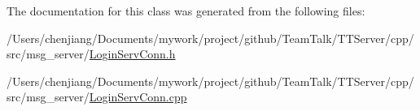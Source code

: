 The documentation for this class was generated from the following files\+:\begin{DoxyCompactItemize}
\item 
/\+Users/chenjiang/\+Documents/mywork/project/github/\+Team\+Talk/\+T\+T\+Server/cpp/src/msg\+\_\+server/\hyperlink{_login_serv_conn_8h}{Login\+Serv\+Conn.\+h}\item 
/\+Users/chenjiang/\+Documents/mywork/project/github/\+Team\+Talk/\+T\+T\+Server/cpp/src/msg\+\_\+server/\hyperlink{_login_serv_conn_8cpp}{Login\+Serv\+Conn.\+cpp}\end{DoxyCompactItemize}
